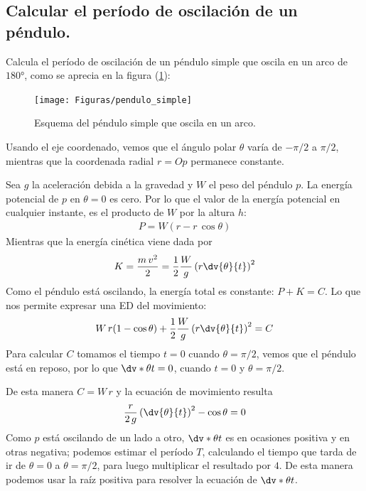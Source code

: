 \subsection*{Calcular el período de oscilación de un péndulo.}
Calcula el período de oscilación de un péndulo simple que oscila en un arco de $\ang{180}$, como se aprecia en la figura (\ref{fig:figura_02}):
\begin{figure}[!ht]
    \centering
    \texttt{[image: Figuras/pendulo\_simple]}
    \caption{Esquema del péndulo simple que oscila en un arco.}
    \label{fig:figura_02}
\end{figure}
Usando el eje coordenado, vemos que el ángulo polar $\theta$ varía de $-\pi/2$ a $\pi/2$, mientras que la coordenada radial $r = Op$ permanece constante.
\par
Sea $g$ la aceleración debida a la gravedad y $W$ el peso del péndulo $p$. La energía potencial de $p$ en $\theta = 0$ es cero. Por lo que el valor de la energía potencial en cualquier instante, es el producto de $W$ por la altura $h$:
\begin{align*}
P = W (r - r \, \cos \theta)
\end{align*}
Mientras que la energía cinética viene dada por
\begin{align*}
K = \dfrac{m \, v^{2}}{2} = \dfrac{1}{2} \dfrac{W}{g} \left( r \dv{\theta}{t} \right)^{2}
\end{align*}
Como el péndulo está oscilando, la energía total es constante: $P + K = C$. Lo que nos permite expresar una ED del movimiento:
\begin{align*}
W \, r (1 - \cos \theta) + \dfrac{1}{2} \dfrac{W}{g} \left( r \dv{\theta}{t} \right)^{2} = C
\end{align*}
Para calcular $C$ tomamos el tiempo $t = 0$ cuando $\theta = \pi/2$, vemos que el péndulo está en reposo, por lo que $\dv*{\theta}{t} = 0$, cuando $t = 0$ y $\theta = \pi/2$.
\par
De esta manera $C = W \, r$ y la ecuación de movimiento resulta
\begin{align*}
\dfrac{r}{2 \, g} \left( \dv{\theta}{t} \right)^{2} - \cos \theta = 0
\end{align*}
Como $p$ está oscilando de un lado a otro, $\dv*{\theta}{t}$ es en ocasiones positiva y en otras negativa; podemos estimar el período $T$, calculando el tiempo que tarda de ir de $\theta=0$ a $\theta=\pi/2$, para luego multiplicar el resultado por $4$. De esta manera podemos usar la raíz positiva para resolver la ecuación de $\dv*{\theta}{t}$.
\par
